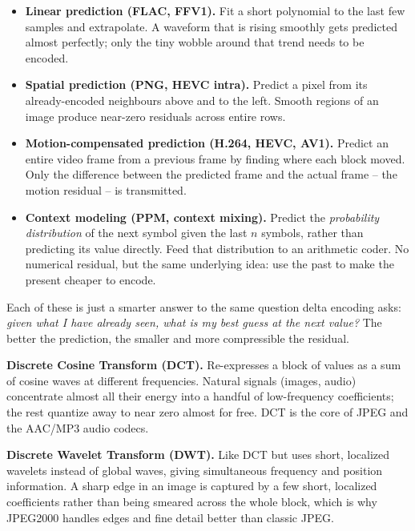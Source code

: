 \documentclass[11pt]{article}
\begin{document}
\begin{itemize}
\item \textbf{Linear prediction (FLAC, FFV1).} Fit a short polynomial
  to the last few samples and extrapolate. A waveform that is rising
  smoothly gets predicted almost perfectly; only the tiny wobble around
  that trend needs to be encoded.
\item \textbf{Spatial prediction (PNG, HEVC intra).} Predict a pixel
  from its already-encoded neighbours above and to the left. Smooth
  regions of an image produce near-zero residuals across entire rows.
\item \textbf{Motion-compensated prediction (H.264, HEVC, AV1).}
  Predict an entire video frame from a previous frame by finding where
  each block moved. Only the difference between the predicted frame and
  the actual frame -- the motion residual -- is transmitted.
\item \textbf{Context modeling (PPM, context mixing).} Predict the
  \emph{probability distribution} of the next symbol given the last
  $n$ symbols, rather than predicting its value directly. Feed that
  distribution to an arithmetic coder. No numerical residual, but the
  same underlying idea: use the past to make the present cheaper to
  encode.
\end{itemize}

Each of these is just a smarter answer to the same question delta
encoding asks: \emph{given what I have already seen, what is my best
guess at the next value?} The better the prediction, the smaller and
more compressible the residual.

\textbf{Discrete Cosine Transform (DCT).} Re-expresses a block of values
as a sum of cosine waves at different frequencies. Natural signals
(images, audio) concentrate almost all their energy into a handful of
low-frequency coefficients; the rest quantize away to near zero almost
for free. DCT is the core of JPEG and the AAC/MP3 audio codecs.

\textbf{Discrete Wavelet Transform (DWT).} Like DCT but uses short,
localized wavelets instead of global waves, giving simultaneous
frequency and position information. A sharp edge in an image is captured
by a few short, localized coefficients rather than being smeared across
the whole block, which is why JPEG2000 handles edges and fine detail
better than classic JPEG.
\end{document}
